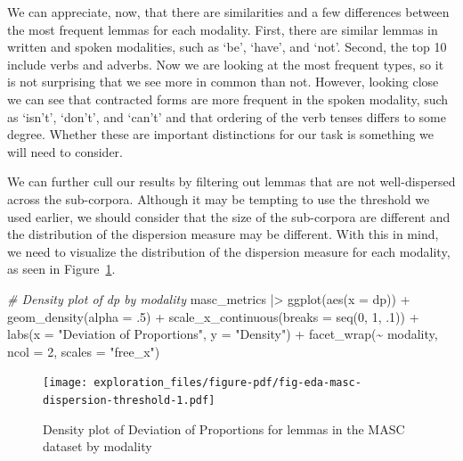 \documentclass[
  letterpaper,
  DIV=11,
  numbers=noendperiod]{scrreport}
\newenvironment{Shaded}{\begin{snugshade}}{\end{snugshade}}
\newcommand{\AttributeTok}[1]{\textcolor[rgb]{0.00,0.00,0.00}{#1}}
\newcommand{\CommentTok}[1]{\textcolor[rgb]{0.00,0.00,0.00}{\textit{#1}}}
\newcommand{\DecValTok}[1]{\textcolor[rgb]{0.00,0.00,0.00}{#1}}
\newcommand{\FunctionTok}[1]{\textcolor[rgb]{0.00,0.00,0.00}{#1}}
\newcommand{\NormalTok}[1]{\textcolor[rgb]{0.00,0.00,0.00}{#1}}
\newcommand{\SpecialCharTok}[1]{\textcolor[rgb]{0.00,0.00,0.00}{#1}}
\newcommand{\StringTok}[1]{\textcolor[rgb]{0.00,0.00,0.00}{#1}}
\theoremstyle{definition}
\theoremstyle{remark}
\begin{document}
We can appreciate, now, that there are similarities and a few
differences between the most frequent lemmas for each modality. First,
there are similar lemmas in written and spoken modalities, such as `be',
`have', and `not'. Second, the top 10 include verbs and adverbs. Now we
are looking at the most frequent types, so it is not surprising that we
see more in common than not. However, looking close we can see that
contracted forms are more frequent in the spoken modality, such as
`isn't', `don't', and `can't' and that ordering of the verb tenses
differs to some degree. Whether these are important distinctions for our
task is something we will need to consider.

We can further cull our results by filtering out lemmas that are not
well-dispersed across the sub-corpora. Although it may be tempting to
use the threshold we used earlier, we should consider that the size of
the sub-corpora are different and the distribution of the dispersion
measure may be different. With this in mind, we need to visualize the
distribution of the dispersion measure for each modality, as seen in
Figure~\ref{fig-eda-masc-dispersion-threshold}.

\begin{Shaded}
\begin{Highlighting}[]
\CommentTok{\# Density plot of dp by modality}
\NormalTok{masc\_metrics }\SpecialCharTok{|\textgreater{}} 
  \FunctionTok{ggplot}\NormalTok{(}\FunctionTok{aes}\NormalTok{(}\AttributeTok{x =}\NormalTok{ dp)) }\SpecialCharTok{+}
  \FunctionTok{geom\_density}\NormalTok{(}\AttributeTok{alpha =}\NormalTok{ .}\DecValTok{5}\NormalTok{) }\SpecialCharTok{+}
  \FunctionTok{scale\_x\_continuous}\NormalTok{(}\AttributeTok{breaks =} \FunctionTok{seq}\NormalTok{(}\DecValTok{0}\NormalTok{, }\DecValTok{1}\NormalTok{, .}\DecValTok{1}\NormalTok{)) }\SpecialCharTok{+}
  \FunctionTok{labs}\NormalTok{(}\AttributeTok{x =} \StringTok{"Deviation of Proportions"}\NormalTok{, }\AttributeTok{y =} \StringTok{"Density"}\NormalTok{) }\SpecialCharTok{+}
  \FunctionTok{facet\_wrap}\NormalTok{(}\SpecialCharTok{\textasciitilde{}}\NormalTok{ modality, }\AttributeTok{ncol =} \DecValTok{2}\NormalTok{, }\AttributeTok{scales =} \StringTok{"free\_x"}\NormalTok{)}
\end{Highlighting}
\end{Shaded}

\begin{figure}[H]

{\centering \texttt{[image: exploration\_files/figure-pdf/fig-eda-masc-dispersion-threshold-1.pdf]}

}

\caption{\label{fig-eda-masc-dispersion-threshold}Density plot of
Deviation of Proportions for lemmas in the MASC dataset by modality}

\end{figure}
\end{document}
